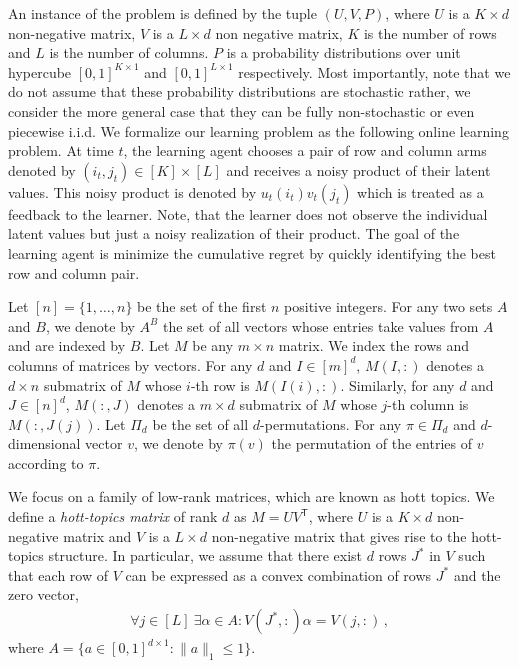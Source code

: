 
\newcommand{\transpose}{^\mathsf{\scriptscriptstyle T}}

An instance of the problem is defined by the tuple $(U,V,P)$, where $U$ is a $K\times d$ non-negative matrix, $V$ is a $L\times d$ non negative matrix, $K$ is the number of rows and $L$ is the number of columns. $P$ is a probability distributions over unit hypercube $[0,1]^{K\times 1}$ and $[0,1]^{L\times 1}$ respectively. Most importantly, note that we do not assume that these probability distributions are stochastic rather, we consider the more general case that they can be fully non-stochastic or even piecewise i.i.d. We formalize our learning problem as the following online learning problem. At time $t$, the learning agent chooses a pair of row and column arms denoted by $(i_t, j_t) \in [K]\times [L]$ and receives a noisy product of their latent values. This noisy product is denoted by $u_t(i_t)v_t(j_t)$ which is treated as a feedback to the learner. Note, that the learner does not observe the individual latent values but just a noisy realization of their product. The goal of the learning agent is minimize the cumulative regret by quickly identifying the best row and column pair.

Let $[n] = \{1, \dots, n\}$ be the set of the first $n$ positive integers. For any two sets $A$ and $B$, we denote by $A^B$ the set of all vectors whose entries take values from $A$ and are indexed by $B$. Let $M$ be any $m \times n$ matrix. We index the rows and columns of matrices by vectors. For any $d$ and $I \in [m]^d$, $M(I, :)$ denotes a $d \times n$ submatrix of $M$ whose $i$-th row is $M(I(i), :)$. Similarly, for any $d$ and $J \in [n]^d$, $M(:, J)$ denotes a $m \times d$ submatrix of $M$ whose $j$-th column is $M(:, J(j))$. Let $\Pi_d$ be the set of all $d$-permutations. For any $\pi \in \Pi_d$ and $d$-dimensional vector $v$, we denote by $\pi(v)$ the permutation of the entries of $v$ according to $\pi$.

We focus on a family of low-rank matrices, which are known as hott topics. We define a \emph{hott-topics matrix} of rank $d$ as $M = U V\transpose$, where $U$ is a $K \times d$ non-negative matrix and $V$ is a $L \times d$ non-negative matrix that gives rise to the hott-topics structure. In particular, we assume that there exist $d$ rows $J^\ast$ in $V$ such that each row of $V$ can be expressed as a convex combination of rows $J^\ast$ and the zero vector,
\begin{align}
  \forall j \in [L] \ \exists \alpha \in A: V(J^\ast, :) \alpha = V(j, :)\,,
  \label{eq:hott topics}
\end{align}
where $A = \{a \in [0, 1]^{d \times 1}: \|a\|_1 \leq 1\}$.

